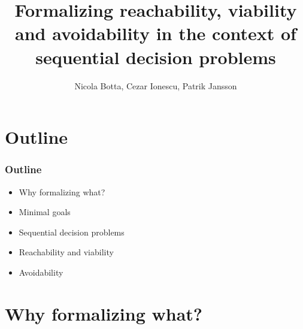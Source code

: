 \documentclass[colorhighlight,coloremph]{beamer}
\title{Formalizing reachability, viability and avoidability in the
  context of sequential decision problems}
\author{Nicola Botta, Cezar Ionescu, Patrik Jansson}
\begin{document}
\date{}
\frame{\maketitle}


\section{Outline}


\begin{frame}[fragile]
\frametitle{Outline}
%
\begin{itemize}
\vspace{0.3\normalbaselineskip}
\item Why formalizing what?
\vspace{0.3\normalbaselineskip}
\item Minimal goals
\vspace{0.3\normalbaselineskip}
\item Sequential decision problems
\vspace{0.3\normalbaselineskip}
\item Reachability and viability
\vspace{0.3\normalbaselineskip}
\item Avoidability
\end{itemize}
\vfill
%
\end{frame}



\section{Why formalizing what?}

\end{document}
